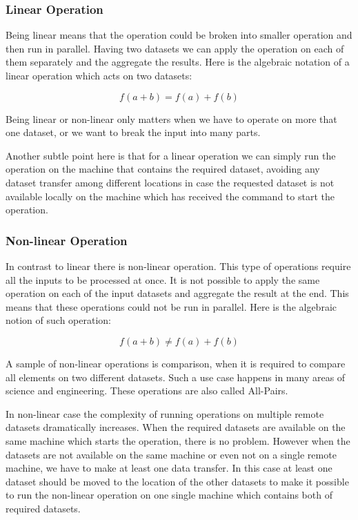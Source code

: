 \subsubsection{Linear Operation}
Being linear means that the operation
could be broken into smaller operation and then run in parallel. Having two datasets we can apply the
operation on each of them separately and the aggregate the results. Here is the algebraic notation
of a linear operation which acts on two datasets:

\[ f(a + b) = f(a) + f(b) \]

Being linear or non-linear only matters when we have to operate on more that one dataset, or we want to
break the input into many parts.

Another subtle point here is that for a linear operation we can simply run the operation on the machine that
contains the required dataset, avoiding any dataset transfer among different locations in case the requested
dataset is not available locally on the machine which has received the command to start the operation.

\subsubsection{Non-linear Operation}
In contrast to linear there is non-linear operation. This type of operations require all the inputs to be processed
at once. It is not possible to apply the same operation on each of the input datasets and aggregate the result at the
end. This means that these operations could not be run in parallel.
Here is the algebraic notion of such operation:

\[ f(a + b) \neq f(a) + f(b) \]

A sample of non-linear operations is comparison, when it is required to compare all elements on two different datasets. 
Such a use case happens in many areas of science and engineering. These operations are also called All-Pairs. \cite{moretti08}

In non-linear case the complexity of running operations on multiple remote datasets dramatically increases. When the required
datasets are available on the same machine which starts the operation, there is no problem. However when the datasets are not
available on the same machine or even not on a single remote machine, we have to make at least one data transfer. In this 
case at least one dataset should be moved to the location of the other datasets to make it possible to run the non-linear
operation on one single machine which contains both of required datasets.

